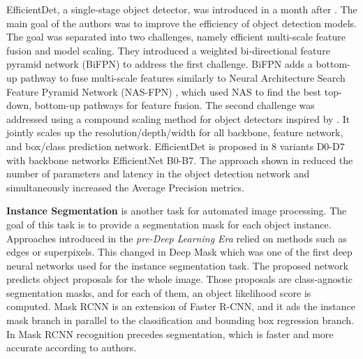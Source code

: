 \documentclass{article}
\begin{document}
EfficientDet, a single-stage object detector, was introduced in \cite{efficientdet2020} a month after \cite{carion2020end}.
The main goal of the authors was to improve the efficiency of object detection models.
The goal was separated into two challenges, namely efficient multi-scale feature fusion and model scaling.
They introduced a weighted bi-directional feature pyramid network (BiFPN) to address the first challenge.
BiFPN adds a bottom-up pathway to fuse multi-scale features similarly to Neural Architecture Search Feature Pyramid Network (NAS-FPN) \cite{ghiasi2019fpn}, which used NAS to find the best top-down, bottom-up pathways for feature fusion.
The second challenge was addressed using a compound scaling method for object detectors inspired by \cite{efficientnet2019}.
It jointly scales up the resolution/depth/width for all backbone, feature network, and box/class prediction network.
EfficientDet is proposed in 8 variants D0-D7 with backbone networks EfficientNet B0-B7.
The approach shown in \cite{efficientdet2020} reduced the number of parameters and latency in the object detection network and simultaneously increased the Average Precision metrics.

\textbf{Instance Segmentation} is another task for automated image processing.
The goal of this task is to provide a segmentation mask for each object instance.
Approaches introduced in the \textit{pre-Deep Learning Era} relied on methods such as edges or superpixels.
This changed in Deep Mask \cite{DBLP:journals/corr/PinheiroCD15} which was one of the first deep neural networks used for the instance segmentation task.
The proposed network predicts object proposals for the whole image.
Those proposals are class-agnostic segmentation masks, and for each of them, an object likelihood score is computed.
Mask RCNN \cite{he2017mask} is an extension of Faster R-CNN, and it ads the instance mask branch in parallel to the classification and bounding box regression branch.
In Mask RCNN recognition precedes segmentation, which is faster and more accurate according to authors. 
\end{document}
